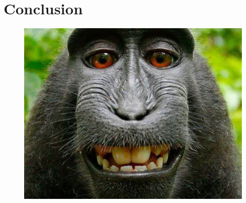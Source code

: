\documentclass[CMPE]{KGCOEReport}
\begin{document}
\section*{Conclusion}

\newpage
\begin{figure}[H]
    \centering
    \begin{adjustbox}{center}
        \includegraphics[width=1.26\textwidth]{signoff.pdf}
    \end{adjustbox}
\end{figure}
\end{document}
